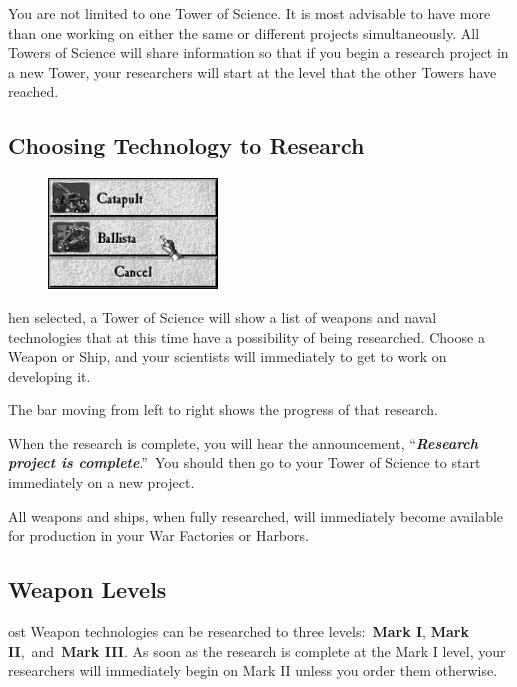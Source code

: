 You are not limited to one Tower of Science. It is most advisable to have more than one working on either the same or different projects simultaneously. All Towers of Science will share information so that if you begin a research project in a new Tower, your researchers will start at the level that the other Towers have reached.

\clearpage

\subsection{Choosing Technology to Research}

\begin{figure}
	\vspace{-20pt}
	\begin{center}
		\includegraphics[width=0.4\textwidth]{Iresearch_begin}
	\end{center}
	\vspace{-20pt}
\end{figure}

hen selected, a Tower of Science will show a list of weapons and naval technologies that at this time have a possibility of being researched. Choose a Weapon or Ship, and your scientists will immediately to get to work on developing it.

The bar moving from left to right shows the progress of that research.

When the research is complete, you will hear the announcement, “\textbf{\textit{Research project is complete}}.” You should then go to your Tower of Science to start immediately on a new project.

All weapons and ships, when fully researched, will immediately become available for production in your War Factories or Harbors.

\subsection{Weapon Levels}

ost Weapon technologies can be researched to three levels: \textbf{Mark I}, \textbf{Mark II}, and \textbf{Mark III}. As soon as the research is complete at the Mark I level, your researchers will immediately begin on Mark II unless you order them otherwise.

